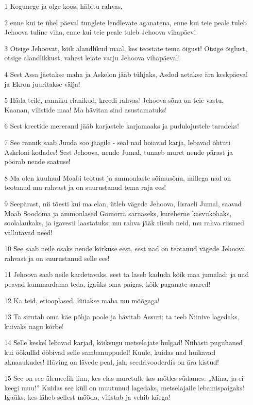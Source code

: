 \par 1 Kogunege ja olge koos, häbitu rahvas,
\par 2 enne kui te ühel päeval tunglete lendlevate aganatena, enne kui teie peale tuleb Jehoova tuline viha, enne kui teie peale tuleb Jehoova vihapäev!
\par 3 Otsige Jehoovat, kõik alandlikud maal, kes teostate tema õigust! Otsige õiglust, otsige alandlikkust, vahest leiate varju Jehoova vihapäeval!
\par 4 Sest Assa jäetakse maha ja Askelon jääb tühjaks, Asdod aetakse ära keskpäeval ja Ekron juuritakse välja!
\par 5 Häda teile, ranniku elanikud, kreedi rahvas! Jehoova sõna on teie vastu, Kaanan, vilistide maa! Ma hävitan sind asustamatuks!
\par 6 Sest kreetide mererand jääb karjastele karjamaaks ja pudulojustele taradeks!
\par 7 See rannik saab Juuda soo jäägile - seal nad hoiavad karja, lebavad õhtuti Askeloni kodades! Sest Jehoova, nende Jumal, tunneb muret nende pärast ja pöörab nende saatuse!
\par 8 Ma olen kuulnud Moabi teotust ja ammonlaste sõimusõnu, millega nad on teotanud mu rahvast ja on suurustanud tema raja ees!
\par 9 Seepärast, nii tõesti kui ma elan, ütleb vägede Jehoova, Iisraeli Jumal, saavad Moab Soodoma ja ammonlased Gomorra sarnaseks, kureherne kasvukohaks, soolalaukaks, ja igavesti laastatuks; mu rahva jääk riisub neid, mu rahva riismed vallutavad need!
\par 10 See saab neile osaks nende kõrkuse eest, sest nad on teotanud vägede Jehoova rahvast ja on suurustanud selle ees!
\par 11 Jehoova saab neile kardetavaks, sest ta laseb kaduda kõik maa jumalad; ja nad peavad kummardama teda, igaüks oma paigas, kõik paganate saared!
\par 12 Ka teid, etiooplased, lüüakse maha mu mõõgaga!
\par 13 Ta sirutab oma käe põhja poole ja hävitab Assuri; ta teeb Niinive lagedaks, kuivaks nagu kõrbe!
\par 14 Selle keskel lebavad karjad, kõiksugu metselajate hulgad! Niihästi puguhaned kui öökullid ööbivad selle sambanuppudel! Kuule, kuidas nad huikavad aknaaukudes! Häving on lävede peal, jah, seedrivooderdis on ära kistud!
\par 15 See on see ülemeelik linn, kes elas muretult, kes mõtles südames: „Mina, ja ei keegi muu!” Kuidas see küll on muutunud lagedaks, metselajaile lebamispaigaks! Igaüks, kes läheb sellest mööda, vilistab ja vehib käega!


